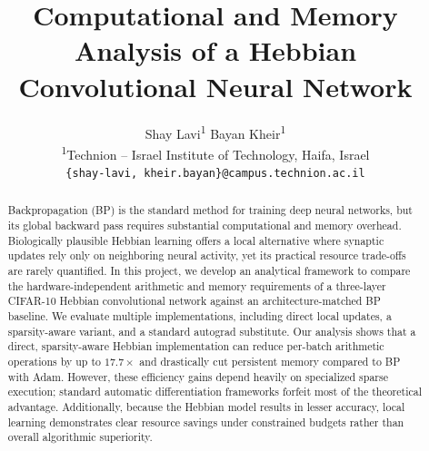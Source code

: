 \documentclass{article}
\title{Computational and Memory Analysis of a Hebbian Convolutional Neural Network}
\author{%
      Shay Lavi\textsuperscript{1} \quad
      Bayan Kheir\textsuperscript{1} \\
      \textsuperscript{1}Technion -- Israel Institute of Technology, Haifa, Israel \\
      \texttt{\{shay-lavi, kheir.bayan\}@campus.technion.ac.il} \quad
    }
\begin{document}
    \maketitle
    \begin{abstract}

Backpropagation (BP) is the standard method for training deep neural networks, but its global backward pass requires substantial computational and memory overhead. Biologically plausible Hebbian learning offers a local alternative where synaptic updates rely only on neighboring neural activity, yet its practical resource trade-offs are rarely quantified. In this project, we develop an analytical framework to compare the hardware-independent arithmetic and memory requirements of a three-layer CIFAR-10 Hebbian convolutional network against an architecture-matched BP baseline. We evaluate multiple implementations, including direct local updates, a sparsity-aware variant, and a standard autograd substitute. Our analysis shows that a direct, sparsity-aware Hebbian implementation can reduce per-batch arithmetic operations by up to $17.7\times$ and drastically cut persistent memory compared to BP with Adam. However, these efficiency gains depend heavily on specialized sparse execution; standard automatic differentiation frameworks forfeit most of the theoretical advantage. Additionally, because the Hebbian model results in lesser accuracy, local learning demonstrates clear resource savings under constrained budgets rather than overall algorithmic superiority.
    
    
    

\end{abstract}
\end{document}
